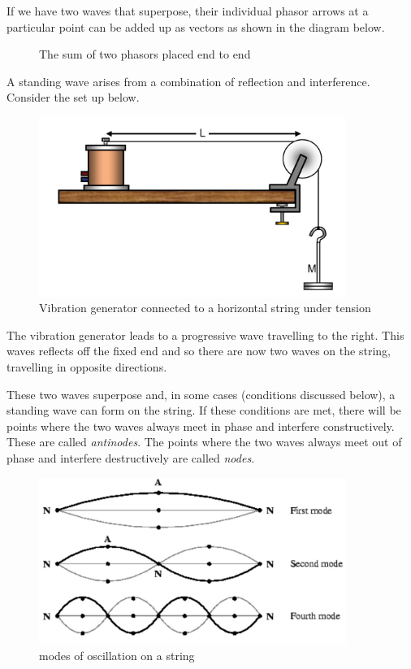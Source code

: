 \documentclass[revision-guide.tex]{subfiles}
\begin{document}
If we have two waves that superpose, their individual phasor arrows at a particular point can be added up as vectors as shown in the diagram below.

\begin{figure}[h]
\centering
{}
\caption{The sum of two phasors placed end to end}
\end{figure}


A standing wave arises from a combination of reflection and interference. Consider the set up below.

\begin{figure}[h!]
\centering
\includegraphics[width=10cm]{figs/chapt-7/melde.JPG}
\caption{Vibration generator connected to a horizontal string under tension}
\end{figure}

The vibration generator leads to a progressive wave travelling to the right. This waves reflects off the fixed end and so there are now two waves on the string, travelling in opposite directions.

These two waves superpose and, in some cases (conditions discussed below), a standing wave can form on the string. If these conditions are met, there will be points where the two waves always meet in phase and interfere constructively. These are called \emph{antinodes}. The points where the two waves always meet out of phase and interfere destructively are called \emph{nodes}.

\begin{figure}[h!]
\centering
\includegraphics[width=10cm]{figs/chapt-7/string.JPG}
\caption{modes of oscillation on a string}
\end{figure}
\end{document}
